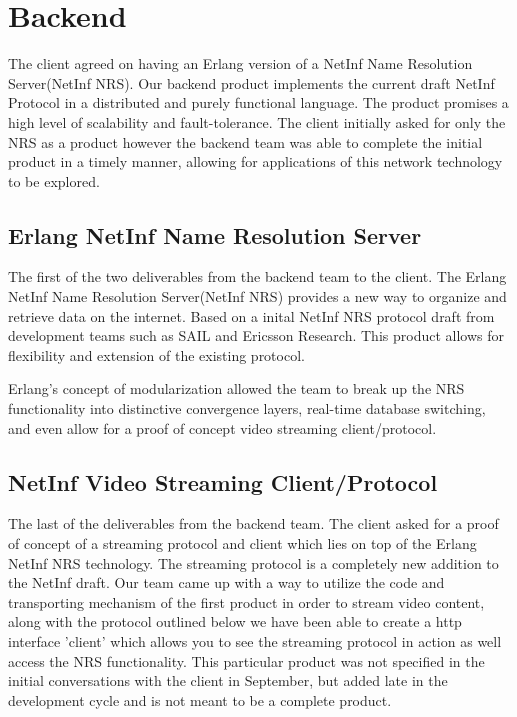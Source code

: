 \section {Backend}

The client agreed on having an Erlang version of a NetInf Name Resolution Server(NetInf NRS).  Our backend product implements the current draft NetInf Protocol in a distributed and purely functional language. The product promises a high level of scalability and fault-tolerance. The client initially asked for only the NRS as a product however the backend team was able to complete the initial product in a timely manner, allowing for applications of this network technology to be explored. 


\subsection {Erlang NetInf Name Resolution Server}
The first of the two deliverables from the backend team to the client. The Erlang NetInf Name Resolution Server(NetInf NRS) provides a new way to organize and retrieve data on the internet. Based on a inital NetInf NRS protocol draft from development teams such as SAIL and Ericsson Research. This product allows for flexibility and extension of the existing protocol.

Erlang's concept of modularization allowed the team to break up the NRS functionality into distinctive convergence layers, real-time database switching, and even allow for a proof of concept video streaming client/protocol. 

\subsection{NetInf Video Streaming Client/Protocol}

The last of the deliverables from the backend team. The client asked for a proof of concept of a streaming protocol and client which lies on top of the Erlang NetInf NRS technology. The streaming protocol is a completely new addition to the NetInf draft. Our team came up with a way to utilize the code and transporting mechanism of the first product in order to stream video content, along with the protocol outlined below we have been able to create a http interface 'client' which allows you to see the streaming protocol in action as well access the NRS functionality. This particular product was not specified in the initial conversations with the client in September, but added late in the development cycle and is not meant to be a complete product.

